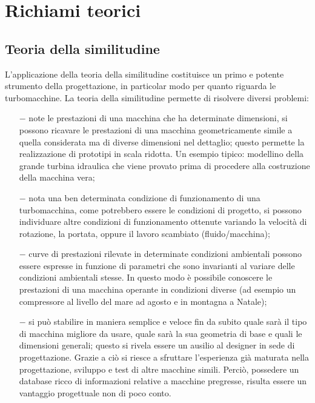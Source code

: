 \chapter{Richiami teorici}
\section{Teoria della similitudine}
L’applicazione della teoria della similitudine costituisce un primo e potente strumento della progettazione, in particolar modo per quanto riguarda le turbomacchine. La teoria della similitudine permette di risolvere diversi problemi:
\begin{itemize}
\item[$-$] note le prestazioni di una macchina che ha determinate dimensioni, si possono ricavare le prestazioni di una macchina geometricamente simile a quella considerata ma di diverse dimensioni nel dettaglio; questo permette la realizzazione di prototipi in scala ridotta. Un esempio tipico: modellino della grande turbina idraulica che viene provato prima di procedere alla costruzione della macchina vera;
\item[$-$] nota una ben determinata condizione di funzionamento di una turbomacchina, come potrebbero essere le condizioni di progetto, si possono individuare altre condizioni di funzionamento ottenute variando la velocità di rotazione, la portata, oppure il lavoro scambiato (fluido/macchina);
\item[$-$] curve di prestazioni rilevate in determinate condizioni ambientali possono essere espresse in funzione di parametri che sono invarianti al variare delle condizioni ambientali stesse. In questo modo è possibile conoscere le prestazioni di una macchina operante in condizioni diverse (ad esempio un compressore al livello del mare ad agosto e in montagna a Natale);
\item[$-$]si può stabilire in maniera semplice e veloce fin da subito quale sarà il tipo di macchina migliore da usare, quale sarà la sua geometria di base e quali le dimensioni generali; questo si rivela essere un ausilio al designer in sede di progettazione. Grazie a ciò si riesce a sfruttare l’esperienza già maturata nella progettazione, sviluppo e test di altre macchine simili. Perciò, possedere un database ricco di informazioni relative a macchine pregresse, risulta essere un vantaggio progettuale non di poco conto.
\end{itemize}

